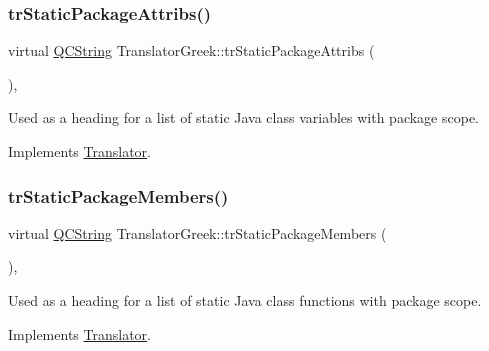 \mbox{\label{class_translator_greek_a934d1a1e2c7d425c5482109510fbd383}} 
\subsubsection{\texorpdfstring{trStaticPackageAttribs()}{trStaticPackageAttribs()}}
{\footnotesize\ttfamily virtual \mbox{\hyperlink{class_q_c_string}{Q\+C\+String}} Translator\+Greek\+::tr\+Static\+Package\+Attribs (\begin{DoxyParamCaption}{ }\end{DoxyParamCaption})\hspace{0.3cm}{\ttfamily [inline]}, {\ttfamily [virtual]}}

Used as a heading for a list of static Java class variables with package scope. 

Implements \mbox{\hyperlink{class_translator}{Translator}}.

\mbox{\label{class_translator_greek_acd1b9849300cd47ae7de1f560ef163f7}} 
\subsubsection{\texorpdfstring{trStaticPackageMembers()}{trStaticPackageMembers()}}
{\footnotesize\ttfamily virtual \mbox{\hyperlink{class_q_c_string}{Q\+C\+String}} Translator\+Greek\+::tr\+Static\+Package\+Members (\begin{DoxyParamCaption}{ }\end{DoxyParamCaption})\hspace{0.3cm}{\ttfamily [inline]}, {\ttfamily [virtual]}}

Used as a heading for a list of static Java class functions with package scope. 

Implements \mbox{\hyperlink{class_translator}{Translator}}.

\mbox{\label{class_translator_greek_ab8d1819d32196a120a7152921d0f0356}} 
